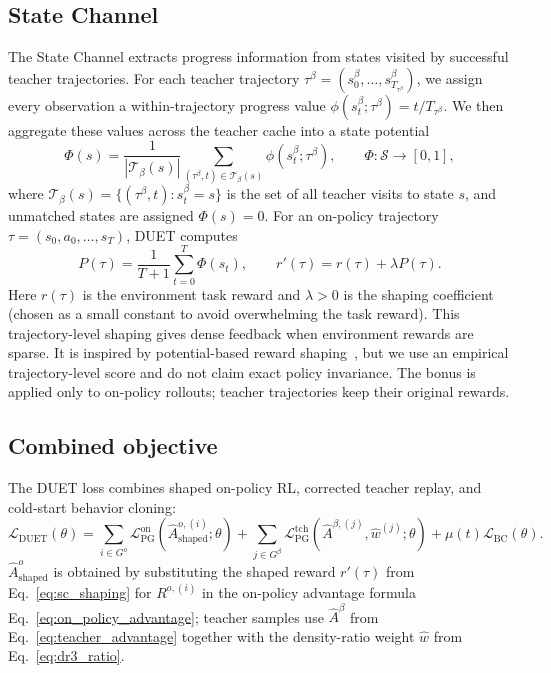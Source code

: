 \subsection{State Channel}
\label{sec:state_channel}

The State Channel extracts progress information from states visited by successful teacher trajectories.
For each teacher trajectory $\tau^\beta=(s_0^\beta,\ldots,s_{T_{\tau^\beta}}^\beta)$, we assign every observation a within-trajectory progress value $\phi(s_t^\beta;\tau^\beta)=t/T_{\tau^\beta}$.
We then aggregate these values across the teacher cache into a state potential
\begin{equation}
\Phi(s)
=
\frac{1}{|\mathcal{T}_\beta(s)|}
\sum_{(\tau^\beta,t)\in\mathcal{T}_\beta(s)}
\phi(s_t^\beta;\tau^\beta),
\qquad
\Phi:\mathcal{S}\to[0,1],
\label{eq:progress_potential}
\end{equation}
where $\mathcal{T}_\beta(s)=\{(\tau^\beta,t):s_t^\beta=s\}$ is the set of all teacher visits to state $s$, and unmatched states are assigned $\Phi(s)=0$.
For an on-policy trajectory $\tau=(s_0,a_0,\ldots,s_T)$, DUET computes
\begin{equation}
P(\tau)
=
\frac{1}{T+1}
\sum_{t=0}^{T}\Phi(s_t),
\qquad
r'(\tau)
=
r(\tau)+\lambda P(\tau).
\label{eq:sc_shaping}
\end{equation}
Here $r(\tau)$ is the environment task reward and $\lambda>0$ is the shaping coefficient (chosen as a small constant to avoid overwhelming the task reward).
This trajectory-level shaping gives dense feedback when environment rewards are sparse.
It is inspired by potential-based reward shaping~\citep{ng1999policy}, but we use an empirical trajectory-level score and do not claim exact policy invariance.
The bonus is applied only to on-policy rollouts; teacher trajectories keep their original rewards.

\subsection{Combined objective}
\label{sec:duet_update}

The DUET loss combines shaped on-policy RL, corrected teacher replay, and cold-start behavior cloning:
\begin{equation}
\mathcal{L}_{\mathrm{DUET}}(\theta)
=
\sum_{i\in G^o}
\mathcal{L}_{\mathrm{PG}}^{\mathrm{on}}
\left(
\hat A_{\mathrm{shaped}}^{o,(i)};\theta
\right)
+
\sum_{j\in G^\beta}
\mathcal{L}_{\mathrm{PG}}^{\mathrm{tch}}
\left(
\hat A^{\beta,(j)},\hat w^{(j)};\theta
\right)
+
\mu(t)\mathcal{L}_{\mathrm{BC}}(\theta).
\label{eq:duet_full_loss}
\end{equation}
$\hat A_{\mathrm{shaped}}^{o}$ is obtained by substituting the shaped reward $r'(\tau)$ from Eq.~\eqref{eq:sc_shaping} for $R^{o,(i)}$ in the on-policy advantage formula Eq.~\eqref{eq:on_policy_advantage}; teacher samples use $\hat A^\beta$ from Eq.~\eqref{eq:teacher_advantage} together with the density-ratio weight $\hat w$ from Eq.~\eqref{eq:dr3_ratio}.